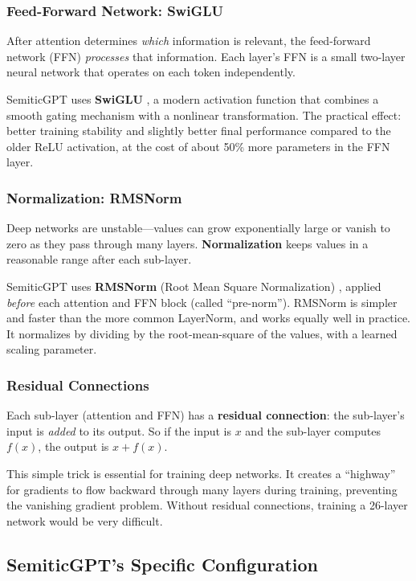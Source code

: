 \documentclass[11pt,a4paper]{article}
\begin{document}
\subsubsection{Feed-Forward Network: SwiGLU}

After attention determines \emph{which} information is relevant, the feed-forward network (FFN) \emph{processes} that information. Each layer's FFN is a small two-layer neural network that operates on each token independently.

SemiticGPT uses \textbf{SwiGLU} \citep{shazeer2020glu}, a modern activation function that combines a smooth gating mechanism with a nonlinear transformation. The practical effect: better training stability and slightly better final performance compared to the older ReLU activation, at the cost of about 50\% more parameters in the FFN layer.

\subsubsection{Normalization: RMSNorm}

Deep networks are unstable---values can grow exponentially large or vanish to zero as they pass through many layers. \textbf{Normalization} keeps values in a reasonable range after each sub-layer.

SemiticGPT uses \textbf{RMSNorm} (Root Mean Square Normalization) \citep{zhang2019rms}, applied \emph{before} each attention and FFN block (called ``pre-norm''). RMSNorm is simpler and faster than the more common LayerNorm, and works equally well in practice. It normalizes by dividing by the root-mean-square of the values, with a learned scaling parameter.

\subsubsection{Residual Connections}

Each sub-layer (attention and FFN) has a \textbf{residual connection}: the sub-layer's input is \emph{added} to its output. So if the input is $x$ and the sub-layer computes $f(x)$, the output is $x + f(x)$.

This simple trick is essential for training deep networks. It creates a ``highway'' for gradients to flow backward through many layers during training, preventing the vanishing gradient problem. Without residual connections, training a 26-layer network would be very difficult.

\subsection{SemiticGPT's Specific Configuration}
\end{document}
